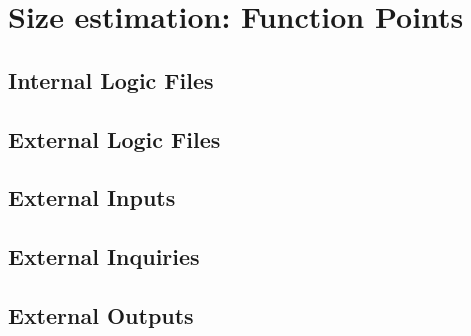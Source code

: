 \section{Size estimation: Function Points}

\subsection{Internal Logic Files}
\blindtext

\subsection{External Logic Files}
\blindtext

\subsection{External Inputs}
\blindtext

\subsection{External Inquiries}
\blindtext

\subsection{External Outputs}
\blindtext
